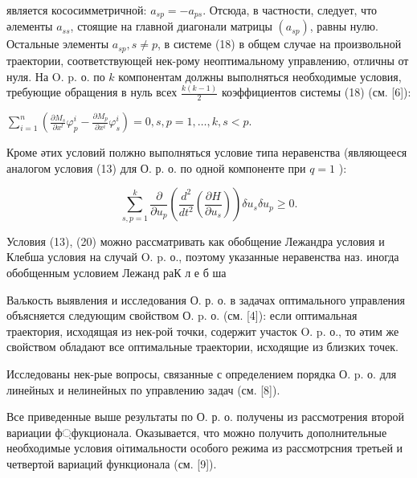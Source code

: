 \documentclass[10pt]{article}
\begin{document}
является кососимметричной: $a_{s p}=-a_{p s}$. Отсюда, в частности, следует, что әлементы $a_{s s}$, стоящие на главной диагонали матрицы $\left(a_{s p}\right)$, равны нулю. Остальные элементы $a_{s p}, s \neq p$, в системе (18) в общем случае на произвольной траектории, соответствующей нек-рому неоптимальному управлению, отличны от нуля. На O. p. о. по $k$ компонентам должны выполняться необходимые условия, требующие обращения в нуль всех $\frac{k(k-1)}{2}$ коэффициентов системы (18) (см. [6]):



$\sum_{i=1}^{n}\left(\frac{\partial M_{s}}{\partial x^{l}} \varphi_{p}^{i}-\frac{\partial M_{p}}{\partial x^{i}} \varphi_{s}^{i}\right)=0, s, p=1, \ldots, k, s<p$.



Кроме әтих условий полжно выполняться условие типа неравенства (являющееся аналогом условия (13) для О. р. о. по одной компоненте при $q=1$ ):



\[

\sum_{s, p=1}^{k} \frac{\partial}{\partial u_{p}}\left(\frac{d^{2}}{d t^{2}}\left(\frac{\partial H}{\partial u_{s}}\right)\right) \delta u_{s} \delta u_{p} \geqslant 0 .

\]



Условия (13), (20) можно рассматривать как обобщение Лежандра условия и Клебша условия на случай O. p. о., поэтому указанные неравенства наз. иногда обобщенным условием Лежанд раК л е б ша



Ваљкость выявления и исследования О. р. о. в задачах оптимального управления объясняется следующим свойством О. p. о. (см. [4]): если оптимальная траектория, исходящая из нек-рой точки, содержит участок O. p. о., то әтим же свойством обладают все оптимальные траектории, исходящие из близких точек.



Исследованы нек-рые вопросы, связанные с определением порядка О. p. о. для линейных и нелинейных по управлению задач (см. [8]).



Все приведенные выше результаты по О. р. о. получены из рассмотрения второй вариации ф্фукционала. Оказывается, что можно получить дополнительные необходимые условия оітимальности особого режима из рассмотрсния третьей и четвертой вариаций функционала (см. [9]).
\end{document}

